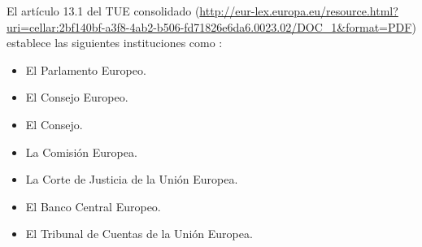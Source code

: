 \documentclass{nuevotema}
\begin{document}
%                

\conceptos

 El artículo 13.1 del TUE consolidado (\url{http://eur-lex.europa.eu/resource.html?uri=cellar:2bf140bf-a3f8-4ab2-b506-fd71826e6da6.0023.02/DOC\_1\&format=PDF}) establece las siguientes instituciones como :
\begin{itemize}
	\item El Parlamento Europeo.
	\item El Consejo Europeo.
	\item El Consejo.
	\item La Comisión Europea.
	\item La Corte de Justicia de la Unión Europea.
	\item El Banco Central Europeo.
	\item El Tribunal de Cuentas de la Unión Europea.
\end{itemize}
\end{document}
